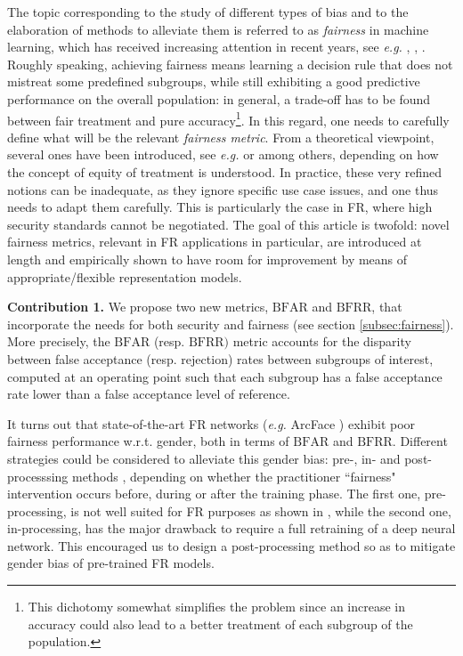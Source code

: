 \documentclass[nohyperref]{article}
\theoremstyle{plain}
\theoremstyle{definition}
\theoremstyle{remark}
\begin{document}
The topic corresponding to the study of different types of bias and to the elaboration of methods to alleviate them is referred to as {\it fairness} in machine learning, which has received increasing attention in recent years, see \textit{e.g.} \cite{survey_fairness_ML}, \cite{caton2020fairness}, \cite{fairness_DL}. Roughly speaking, achieving fairness means learning a decision rule that does not mistreat some predefined subgroups, while still exhibiting a good predictive performance on the overall population: in general, a trade-off has to be found between fair treatment and pure accuracy\footnote{This dichotomy somewhat simplifies the problem since an increase in accuracy could also lead to a better treatment of each subgroup of the population.}. In this regard, one needs to carefully define what will be the relevant {\it fairness metric}. From a theoretical viewpoint, several ones have been introduced, see \textit{e.g.} \cite{garg2020fairness} or \cite{castelnovo2021zoo} among others, depending on how the concept of equity of treatment is understood. In practice, these very refined notions can be inadequate, as they ignore specific use case issues, and one thus needs to adapt them carefully. This is particularly the case in FR, where high security standards cannot be negotiated. The goal of this article is twofold: novel fairness metrics, relevant in FR applications in particular, are introduced at length and empirically shown to have room for improvement by means of appropriate/flexible representation models.

{\bf Contribution 1.} We propose two new metrics, $\mathrm{BFAR}$ and $\mathrm{BFRR}$, that incorporate the needs for both security and fairness (see section \ref{subsec:fairness}). More precisely, the $\mathrm{BFAR}$ (resp. $\mathrm{BFRR})$ metric accounts for the disparity between false acceptance (resp. rejection) rates between subgroups of interest, computed at an operating point such that each subgroup has a false acceptance rate lower than a false acceptance level of reference.

It turns out that state-of-the-art FR networks ({\it e.g.} ArcFace \cite{arcface}) exhibit poor fairness performance w.r.t. gender, both in terms of $\mathrm{BFAR}$ and $\mathrm{BFRR}$. Different strategies could be considered to alleviate this gender bias:  pre-, in- and post-processsing methods \cite{caton2020fairness}, depending on whether the practitioner ``fairness" intervention occurs before, during or after the training phase. The first one, pre-processing, is not well suited for FR purposes as shown in \cite{gender_balanced_data}, while the second one, in-processing, has the major drawback to require a full retraining of a deep neural network. This encouraged us to design a post-processing method so as to mitigate gender bias of pre-trained FR models.
\end{document}
